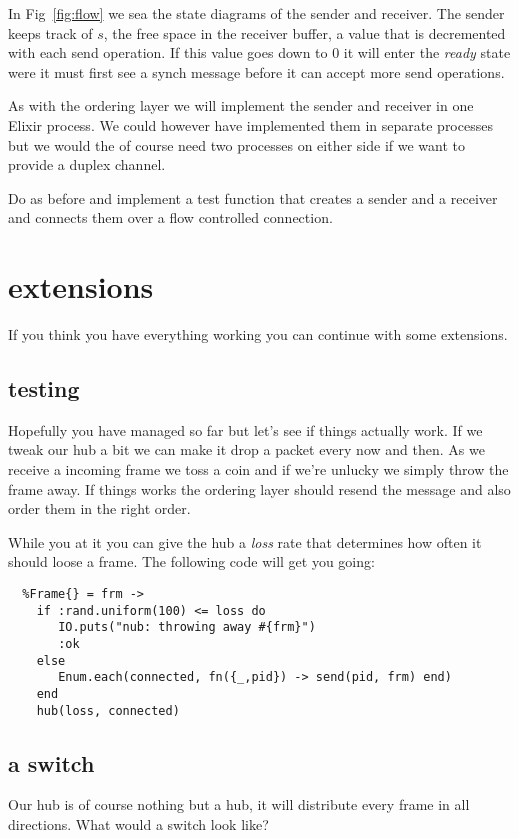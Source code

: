 \documentclass[a4paper,11pt]{article}
\begin{document}
In Fig~\ref{fig:flow} we sea the state diagrams of the sender and
receiver. The sender keeps track of $s$,
the free space in the receiver buffer, a value that is decremented
with each send operation. If this value goes down to $0$
it will enter the {\em ready} state were it must first see a synch
message before it can accept more send operations. 

As with the ordering layer we will implement the sender and receiver
in one Elixir process. We could however have implemented them in
separate processes but we would the of course need two processes on
either side if we want to provide a duplex channel. 

Do as before and implement a test function that creates a sender and a
receiver and connects them over a flow controlled connection.

\section{extensions }

If you think you have everything working you can continue with some
extensions.

\subsection{testing}

Hopefully you have managed so far but let's see if things actually
work. If we tweak our hub a bit we can make it drop a packet every now
and then. As we receive a incoming frame we toss a coin and if we're
unlucky we simply throw the frame away. If things works the ordering
layer should resend the message and also order them in the right
order.

While you at it you can give the hub a {\em loss} rate that
determines how often it should loose a frame. The following code will
get you going:

\begin{verbatim}
  %Frame{} = frm ->
    if :rand.uniform(100) <= loss do
       IO.puts("nub: throwing away #{frm}")
       :ok
    else
       Enum.each(connected, fn({_,pid}) -> send(pid, frm) end)
    end
    hub(loss, connected)
\end{verbatim}

\subsection{a switch}

Our hub is of course nothing but a hub, it will distribute every frame
in all directions. What would a switch look like?
\end{document}
